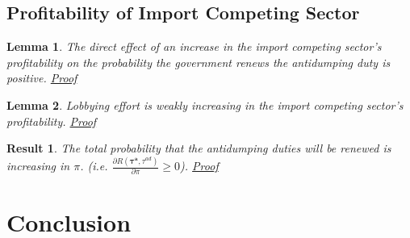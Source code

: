 \documentclass[10pt]{article}
\newtheorem{lemma}{Lemma}
\newtheorem{corollary}{Corollary}
\newtheorem{result}{Result}
\newcommand{\bta}{\bm{\tau^a}}
\newcommand{\tad}{\tau^{ad}}
\newcommand{\ga}{\gamma}
\begin{document}




\subsection{Profitability of Import Competing Sector}
\label{sec:pi}


\begin{lemma}
  The direct effect of an increase in the import competing sector's profitability on the probability the government renews the antidumping duty is positive. \hyperlink{Pr_pi_dir}{Proof}
  \label{res:pi_dir}
\end{lemma}


\begin{lemma}
  Lobbying effort is weakly increasing in the import competing sector's profitability. \hyperlink{Pr_pi_indir}{Proof}
  \label{res:pi_indir}
\end{lemma}


\begin{result}
	The total probability that the antidumping duties will be renewed is increasing in $\pi$. (i.e. $\frac{\partial R(\bta,\tad)}{\partial  \pi} \geq 0$). \hyperlink{Pr_pi_total}{Proof}
	\label{res:pi_total}
\end{result}







\section{Conclusion}
\label{sec:concl}
			
\end{document}
